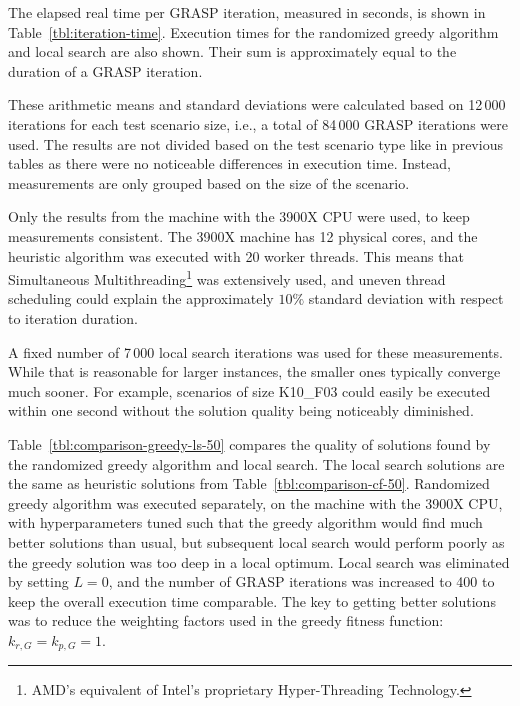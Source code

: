 The elapsed real time per GRASP iteration, measured in seconds, is shown in Table~\ref{tbl:iteration-time}.
Execution times for the randomized greedy algorithm and local search are also shown.
Their sum is approximately equal to the duration of a GRASP iteration.

These arithmetic means and standard deviations were calculated based on 12\,000 iterations for each test scenario size, i.e., a total of 84\,000 GRASP iterations were used.
The results are not divided based on the test scenario type like in previous tables as there were no noticeable differences in execution time.
Instead, measurements are only grouped based on the size of the scenario.

Only the results from the machine with the 3900X CPU were used, to keep measurements consistent.
The 3900X machine has 12 physical cores, and the heuristic algorithm was executed with 20 worker threads.
This means that Simultaneous Multithreading\footnote{AMD's equivalent of Intel's proprietary Hyper-Threading Technology.} was extensively used, and uneven thread scheduling could explain the approximately $10\%$ standard deviation with respect to iteration duration.

A fixed number of 7\,000 local search iterations was used for these measurements.
While that is reasonable for larger instances, the smaller ones typically converge much sooner.
For example, scenarios of size K10\_F03 could easily be executed within one second without the solution quality being noticeably diminished.





Table~\ref{tbl:comparison-greedy-ls-50} compares the quality of solutions found by the randomized greedy algorithm and local search.
The local search solutions are the same as heuristic solutions from Table~\ref{tbl:comparison-cf-50}.
Randomized greedy algorithm was executed separately, on the machine with the 3900X CPU, with hyperparameters tuned such that the greedy algorithm would find much better solutions than usual, but subsequent local search would perform poorly as the greedy solution was too deep in a local optimum.
Local search was eliminated by setting $L = 0$, and the number of GRASP iterations was increased to 400 to keep the overall execution time comparable.
The key to getting better solutions was to reduce the weighting factors used in the greedy fitness function: $k_{r, G} = k_{p, G} = 1$.


